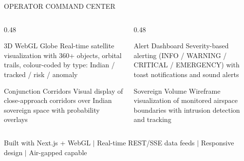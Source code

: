 \documentclass[aspectratio=169,11pt]{beamer}
\begin{document}
\begin{frame}{OPERATOR COMMAND CENTER}
\begin{columns}[T]
  \begin{column}{0.48\textwidth}
    \begin{block}{3D WebGL Globe}
      \small Real-time satellite visualization with 360+ objects, orbital trails, colour-coded by type: Indian / tracked / risk / anomaly
    \end{block}
    \vspace{0.2cm}
    \begin{block}{Conjunction Corridors}
      \small Visual display of close-approach corridors over Indian sovereign space with probability overlays
    \end{block}
  \end{column}
  \begin{column}{0.48\textwidth}
    \begin{block}{Alert Dashboard}
      \small Severity-based alerting (INFO / WARNING / CRITICAL / EMERGENCY) with toast notifications and sound alerts
    \end{block}
    \vspace{0.2cm}
    \begin{block}{Sovereign Volume}
      \small Wireframe visualization of monitored airspace boundaries with intrusion detection and tracking
    \end{block}
  \end{column}
\end{columns}

\vspace{0.4cm}
\centering\small\color{gray}
Built with Next.js + WebGL \(\vert\) Real-time REST/SSE data feeds \(\vert\) Responsive design \(\vert\) Air-gapped capable
\end{frame}
\end{document}
